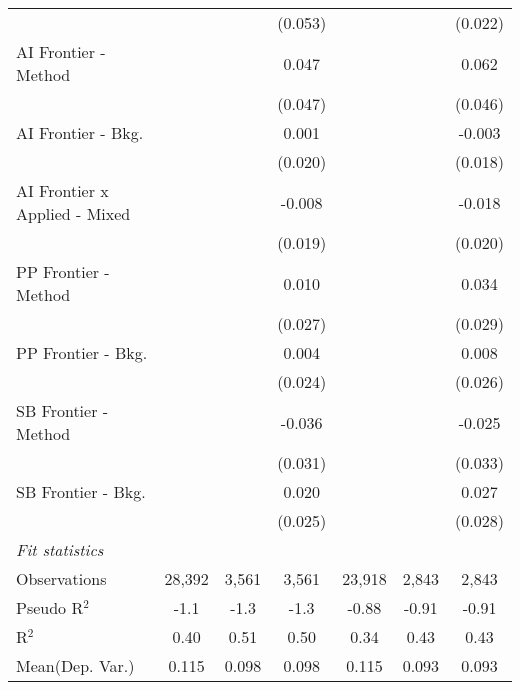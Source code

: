 \begin{tabular}{lcccccc}
                                 &              &                & (0.053) &              &         & (0.022)\\   
   AI Frontier - Method          &              &                & 0.047   &              &         & 0.062\\   
                                 &              &                & (0.047) &              &         & (0.046)\\   
   AI Frontier - Bkg.            &              &                & 0.001   &              &         & -0.003\\   
                                 &              &                & (0.020) &              &         & (0.018)\\   
   AI Frontier x Applied - Mixed &              &                & -0.008  &              &         & -0.018\\   
                                 &              &                & (0.019) &              &         & (0.020)\\   
   PP Frontier - Method          &              &                & 0.010   &              &         & 0.034\\   
                                 &              &                & (0.027) &              &         & (0.029)\\   
   PP Frontier - Bkg.            &              &                & 0.004   &              &         & 0.008\\   
                                 &              &                & (0.024) &              &         & (0.026)\\   
   SB Frontier - Method          &              &                & -0.036  &              &         & -0.025\\   
                                 &              &                & (0.031) &              &         & (0.033)\\   
   SB Frontier - Bkg.            &              &                & 0.020   &              &         & 0.027\\   
                                 &              &                & (0.025) &              &         & (0.028)\\   
   \midrule
   \emph{Fit statistics}\\
   Observations                  & 28,392       & 3,561          & 3,561   & 23,918       & 2,843   & 2,843\\  
   Pseudo R$^2$                  & -1.1         & -1.3           & -1.3    & -0.88        & -0.91   & -0.91\\  
   R$^2$                         & 0.40         & 0.51           & 0.50    & 0.34         & 0.43    & 0.43\\  
Mean(Dep. Var.) & 0.115 & 0.098 & 0.098 & 0.115 & 0.093 & 0.093 \\
   

\end{tabular}
